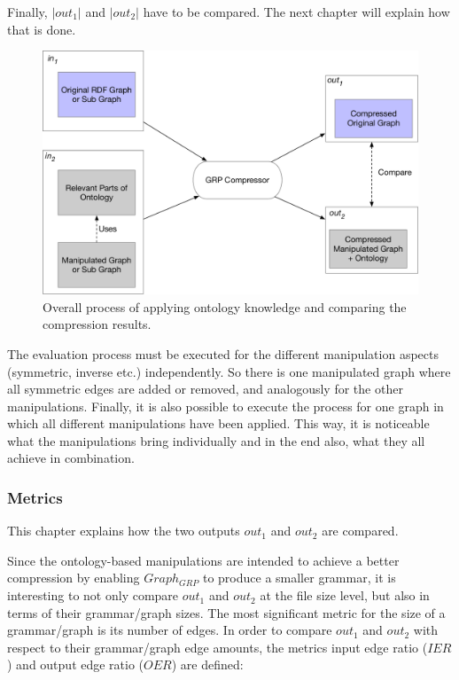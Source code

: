 Finally, $|out_1|$ and $|out_2|$ have to be compared. The next chapter will explain how that is done.

\begin{figure}
	\centering
	\includegraphics[width=0.9\linewidth]{figures/4_implementation/overallProcess}
	\caption{Overall process of applying ontology knowledge and comparing the compression results.}
	\label{fig:overallprocess}
\end{figure}

The evaluation process must be executed for the different manipulation aspects (symmetric, inverse etc.) independently. So there is one manipulated graph where all symmetric edges are added or removed, and analogously for the other manipulations. Finally, it is also possible to execute the process for one graph in which all different manipulations have been applied. This way, it is noticeable what the manipulations bring individually and in the end also, what they all achieve in combination.

\subsubsection{Metrics}

This chapter explains how the two outputs $out_1$ and $out_2$ are compared.

Since the ontology-based manipulations are intended to achieve a better compression by enabling $Graph_{GRP}$ to produce a smaller grammar, it is interesting to not only compare $out_1$ and $out_2$ at the file size level, but also in terms of their grammar/graph sizes. The most significant metric for the size of a grammar/graph is its number of edges. In order to compare $out_1$ and $out_2$ with respect to their grammar/graph edge amounts, the metrics input edge ratio ($IER$) and output edge ratio ($OER$)  are defined:
 
